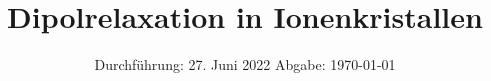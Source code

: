

\subject{V48}
\title{Dipolrelaxation in Ionenkristallen}
\date{%
  Durchführung: 27. Juni 2022
  \hspace{3em}
  Abgabe: \today
}



\maketitle
\thispagestyle{empty}
\tableofcontents
\newpage








\nocite{matplotlib}
\nocite{numpy}
\nocite{scipy}
\nocite{uncertainties}
\printbibliography{}


